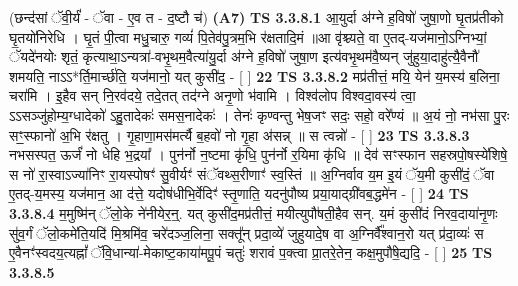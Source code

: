 \documentclass[17pt]{extarticle}
\begin{document}
                      (छन्द॑सां ॅवी॒र्यं॑ - ॅवा - ए॒व त - द॒ष्टौ च॑)  \textbf{(A7)} \newline \newline
                                        \textbf{ TS 3.3.8.1} \newline
                  आ॒युर्दा अ॑ग्ने ह॒विषो॑ जुषा॒णो घृ॒तप्र॑तीको घृ॒तयो॑निरेधि । घृ॒तं पी॒त्वा मधु॒चारु॒ गव्यं॑ पि॒तेव॑पु॒त्रम॒भि र॑क्षतादि॒मं ॥आ वृ॑श्च्यते॒ वा ए॒तद्-यज॑मानो॒ऽग्निभ्यां॒ ॅयदे॑नयोः शृतं॒ कृत्याथा॒ऽन्यत्रा॑-वभृ॒थम॒वैत्या॑यु॒र्दा अ॑ग्ने ह॒विषो॑ जुषा॒ण इत्य॑वभृ॒थम॑वै॒ष्यन् जु॑हुया॒दाहु॑त्यै॒वैनौ॑ शमयति॒ नाऽऽ*र्ति॒मार्च्छ॑ति॒ यज॑मानो॒ यत् कुसी॑द॒ - [  ] \textbf{  22} \newline
                  \newline
                                \textbf{ TS 3.3.8.2} \newline
                  मप्र॑तीत्तं॒ मयि॒ येन॑ य॒मस्य॑ ब॒लिना॒ चरा॑मि । इ॒हैव सन् नि॒रव॑दये॒ तदे॒तत् तद॑ग्ने अनृ॒णो भ॑वामि । विश्व॑लोप विश्वदा॒वस्य॑ त्वा॒ ऽऽसञ्जु॑होम्य॒ग्धादेको॑ ऽहु॒तादेकः॑ समस॒नादेकः॑ । तेनः॑ कृण्वन्तु भेष॒जꣳ सदः॒ सहो॒ वरे᳚ण्यं ॥ अ॒यं नो॒ नभ॑सा पु॒रः सꣳ॒॒स्फानो॑ अ॒भि र॑क्षतु । गृ॒हाणा॒मस॑मर्त्यै ब॒हवो॑ नो गृ॒हा अ॑सन्न् ॥ स त्वन्नो॑ - [  ] \textbf{  23} \newline
                  \newline
                                \textbf{ TS 3.3.8.3} \newline
                  नभसस्पत॒ ऊर्जं॑ नो धेहि भ॒द्रया᳚ । पुन॑र्नो न॒ष्टमा कृ॑धि॒ पुन॑र्नो र॒यिमा कृ॑धि ॥ देव॑ सꣳस्फान सहस्रपो॒षस्ये॑शिषे॒ स नो॑ रा॒स्वाऽज्या॑निꣳ रा॒यस्पोषꣳ॑ सु॒वीर्यꣳ॑ संॅवथ्स॒रीणाꣳ॑ स्व॒स्तिं ॥ अ॒ग्निर्वाव य॒म इ॒यं ॅय॒मी कुसी॑दं॒ ॅवा ए॒तद्-य॒मस्य॒ यज॑मान॒ आ द॑त्ते॒ यदोष॑धीभि॒र्वेदिꣳ॑ स्तृ॒णाति॒ यदनु॑पौष्य प्रया॒याद्ग्री॑वब॒द्धमे॑न - [  ] \textbf{  24} \newline
                  \newline
                                \textbf{ TS 3.3.8.4} \newline
                  म॒मुष्मि॑न् ॅलो॒के ने॑नीयेर॒न्॒. यत् कुसी॑द॒मप्र॑तीत्तं॒ मयीत्युपौ॑षती॒हैव सन्. य॒मं कुसी॑दं निरव॒दाया॑नृ॒णः सु॑व॒र्गं ॅलो॒कमे॑ति॒यदि॑ मि॒श्रमि॑व॒ चरे॑दञ्ज॒लिना॒ सक्तू᳚न् प्रदा॒व्ये॑ जुहुयादे॒ष वा अ॒ग्निर्वै᳚श्वान॒रो यत् प्र॑दा॒व्यः॑ स ए॒वैनꣳ॑स्वदय॒त्यह्नां᳚ ॅवि॒धान्या॑-मेकाष्ट॒काया॑मपू॒पं चतुः॑ शरावं प॒क्त्वा प्रा॒तरे॒तेन॒ कक्ष॒मुपौ॑षे॒द्यदि॒ - [  ] \textbf{  25} \newline
                  \newline
                                \textbf{ TS 3.3.8.5} \newline
\end{document}
